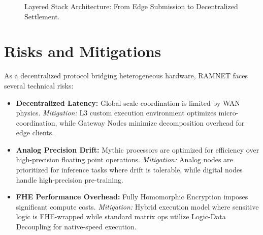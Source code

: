 \documentclass[conference]{IEEEtran}
\begin{document}
\begin{figure}[htbp]
\centering
{}
\caption{Layered Stack Architecture: From Edge Submission to Decentralized Settlement.}
\label{fig:stack_arch}
\end{figure}

\section{Risks and Mitigations}
As a decentralized protocol bridging heterogeneous hardware, RAMNET faces several technical risks:
\begin{itemize}
    \item \textbf{Decentralized Latency:} Global scale coordination is limited by WAN physics. \textit{Mitigation:} L3 custom execution environment optimizes micro-coordination, while Gateway Nodes minimize decomposition overhead for edge clients.
    \item \textbf{Analog Precision Drift:} Mythic processors are optimized for efficiency over high-precision floating point operations. \textit{Mitigation:} Analog nodes are prioritized for inference tasks where drift is tolerable, while digital nodes handle high-precision pre-training.
    \item \textbf{FHE Performance Overhead:} Fully Homomorphic Encryption imposes significant compute costs. \textit{Mitigation:} Hybrid execution model where sensitive logic is FHE-wrapped while standard matrix ops utilize Logic-Data Decoupling for native-speed execution.
\end{itemize}
\end{document}

